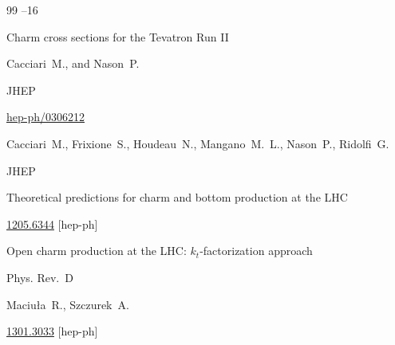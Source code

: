 \begin{thebibliography}{99}
--16






\paper Charm cross sections for the Tevatron Run II






\by Cacciari~M., and Nason~P.

\jour  JHEP 

\arxiv \href{http://arxiv.org/abs/hep-ph/0306212}{hep-ph/0306212}






\by Cacciari~M., Frixione~S., Houdeau~N., Mangano~M.~L., Nason~P., Ridolfi~G.

\jour JHEP 

\paper Theoretical predictions for charm and bottom production at the LHC






\arxiv \href{http://arxiv.org/abs/1205.6344}{1205.6344} [hep-ph]






\paper Open charm production at the LHC: $k_{t}$-factorization approach


\jour Phys. Rev.~D 




\by Maciu{\l}a~R., Szczurek~A.


\arxiv \href{http://arxiv.org/abs/1301.3033}{1301.3033} [hep-ph]





\end{thebibliography}
